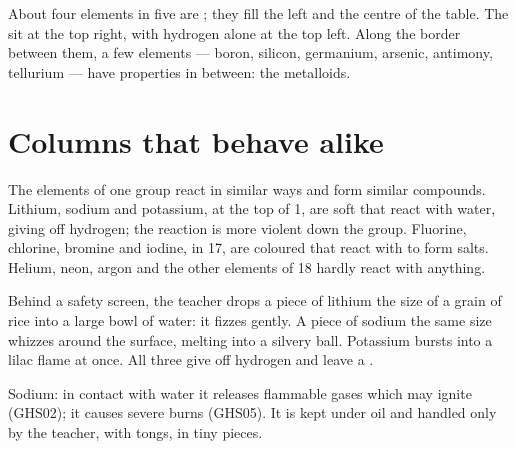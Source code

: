 \begin{proposition}\label{prop:g9:periodic-table-first-look:where}
About four elements in five are ; they fill the left and the
centre of the table. The  sit at the top right, with hydrogen
alone at the top left. Along the border between them, a few elements
--- boron, silicon, germanium, arsenic, antimony, tellurium --- have
properties in between: the metalloids.
\end{proposition}

\section{Columns that behave alike}

\begin{proposition}\label{prop:g9:periodic-table-first-look:alike}
The elements of one group react in similar ways and form similar
compounds. Lithium, sodium and potassium, at the top of  1, are
soft  that react with water, giving off hydrogen; the reaction is
more violent down the group. Fluorine, chlorine, bromine and iodine, in
 17, are coloured  that react with  to form salts.
Helium, neon, argon and the other elements of  18 hardly react
with anything.
\end{proposition}

\begin{inthelab}
Behind a safety screen, the teacher drops a piece of lithium the size of
a grain of rice into a large bowl of water: it fizzes gently. A piece of
sodium the same size whizzes around the surface, melting into a silvery
ball. Potassium bursts into a lilac flame at once. All three give off
hydrogen and leave a .
\end{inthelab}

\begin{safety}{}
Sodium: in contact with water it releases flammable gases which may
ignite (GHS02); it causes severe burns (GHS05). It is kept under oil and
handled only by the teacher, with tongs, in tiny pieces.
\end{safety}

